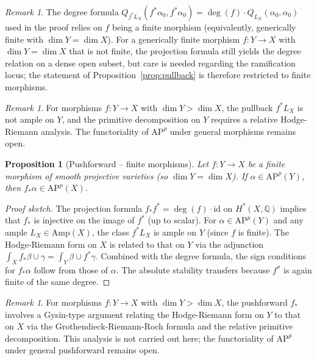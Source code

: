 \documentclass[aps,prd,twocolumn,superscriptaddress,nofootinbib]{revtex4-2}
\newtheorem{proposition}[theorem]{Proposition}
\theoremstyle{definition}
\theoremstyle{remark}
\newtheorem{remark}[theorem]{Remark}
\begin{document}
\begin{remark}
The degree formula $Q_{f^*L_X}(f^*\alpha_0, f^*\alpha_0) = \deg(f) \cdot Q_{L_X}(\alpha_0, \alpha_0)$ used in the proof relies on $f$ being a finite morphism (equivalently, generically finite with $\dim Y = \dim X$). For a generically finite morphism $f: Y \to X$ with $\dim Y = \dim X$ that is not finite, the projection formula still yields the degree relation on a dense open subset, but care is needed regarding the ramification locus; the statement of Proposition~\ref{prop:pullback} is therefore restricted to finite morphisms.
\end{remark}

\begin{remark}
For morphisms $f: Y \to X$ with $\dim Y > \dim X$, the pullback $f^*L_X$ is not ample on $Y$, and the primitive decomposition on $Y$ requires a relative Hodge-Riemann analysis. The functoriality of $\mathrm{AP}^p$ under general morphisms remains open.
\end{remark}

\begin{proposition}[Pushforward -- finite morphisms]
\label{prop:pushforward}
Let $f: Y \to X$ be a finite morphism of smooth projective varieties (so $\dim Y = \dim X$). If $\alpha \in \mathrm{AP}^{p}(Y)$, then $f_*\alpha \in \mathrm{AP}^p(X)$.
\end{proposition}

\begin{proof}[Proof sketch]
The projection formula $f_*f^* = \deg(f) \cdot \mathrm{id}$ on $H^*(X, \mathbb{Q})$ implies that $f_*$ is injective on the image of $f^*$ (up to scalar). For $\alpha \in \mathrm{AP}^p(Y)$ and any ample $L_X \in \mathrm{Amp}(X)$, the class $f^*L_X$ is ample on $Y$ (since $f$ is finite). The Hodge-Riemann form on $X$ is related to that on $Y$ via the adjunction $\int_X f_*\beta \cup \gamma = \int_Y \beta \cup f^*\gamma$. Combined with the degree formula, the sign conditions for $f_*\alpha$ follow from those of $\alpha$. The absolute stability transfers because $f^\sigma$ is again finite of the same degree.
\end{proof}

\begin{remark}
For morphisms $f: Y \to X$ with $\dim Y > \dim X$, the pushforward $f_*$ involves a Gysin-type argument relating the Hodge-Riemann form on $Y$ to that on $X$ via the Grothendieck-Riemann-Roch formula and the relative primitive decomposition. This analysis is not carried out here; the functoriality of $\mathrm{AP}^p$ under general pushforward remains open.
\end{remark}
\end{document}
